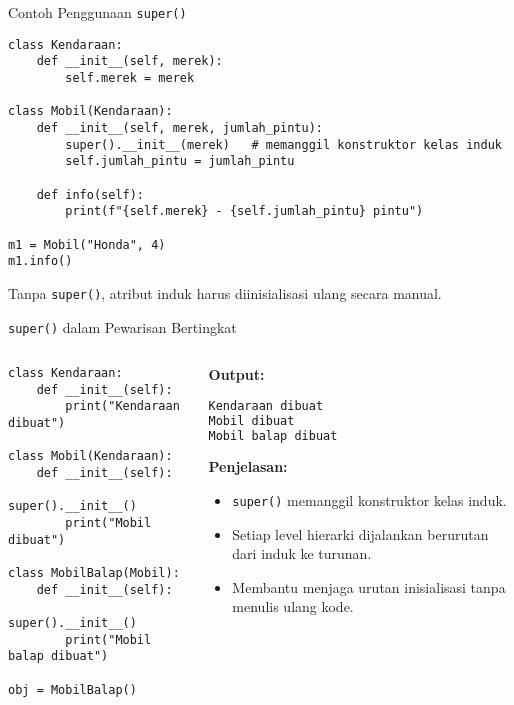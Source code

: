 \documentclass[aspectratio=169, table]{beamer}
\begin{document}
\begin{frame}[fragile]{Contoh Penggunaan \texttt{super()}}
\vspace{20pt}
\begin{lstlisting}[style=PythonStyle]
class Kendaraan:
    def __init__(self, merek):
        self.merek = merek

class Mobil(Kendaraan):
    def __init__(self, merek, jumlah_pintu):
        super().__init__(merek)   # memanggil konstruktor kelas induk
        self.jumlah_pintu = jumlah_pintu

    def info(self):
        print(f"{self.merek} - {self.jumlah_pintu} pintu")

m1 = Mobil("Honda", 4)
m1.info()
\end{lstlisting}
Tanpa \texttt{super()}, atribut induk harus diinisialisasi ulang secara manual.
\end{frame}

\begin{frame}[fragile]{\texttt{super()} dalam Pewarisan Bertingkat}
\vspace{20pt}
\begin{columns}[T]
\begin{column}{0.5\textwidth}
\begin{lstlisting}[style=PythonStyle]
class Kendaraan:
    def __init__(self):
        print("Kendaraan dibuat")

class Mobil(Kendaraan):
    def __init__(self):
        super().__init__()
        print("Mobil dibuat")

class MobilBalap(Mobil):
    def __init__(self):
        super().__init__()
        print("Mobil balap dibuat")

obj = MobilBalap()
\end{lstlisting}
\end{column}

\begin{column}{0.45\textwidth}
\textbf{Output:}
\begin{lstlisting}[language=bash, basicstyle=\ttfamily\small]
Kendaraan dibuat
Mobil dibuat
Mobil balap dibuat
\end{lstlisting}

\textbf{Penjelasan:}
\begin{itemize}
    \item \texttt{super()} memanggil konstruktor kelas induk.
    \item Setiap level hierarki dijalankan berurutan dari induk ke turunan.
    \item Membantu menjaga urutan inisialisasi tanpa menulis ulang kode.
\end{itemize}
\end{column}
\end{columns}
\end{frame}
\end{document}
